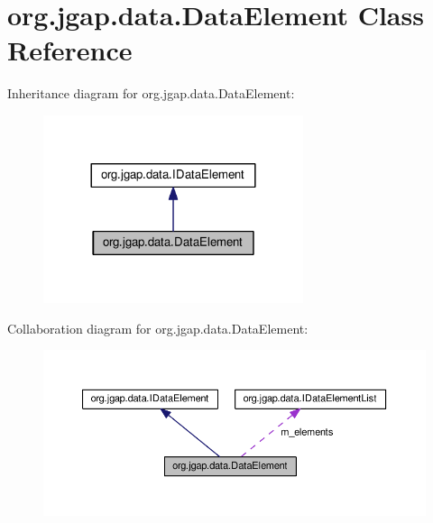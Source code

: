 \hypertarget{classorg_1_1jgap_1_1data_1_1_data_element}{\section{org.\-jgap.\-data.\-Data\-Element Class Reference}
\label{classorg_1_1jgap_1_1data_1_1_data_element}
}


Inheritance diagram for org.\-jgap.\-data.\-Data\-Element\-:
\nopagebreak
\begin{figure}[H]
\begin{center}
\leavevmode
\includegraphics[width=216pt]{classorg_1_1jgap_1_1data_1_1_data_element__inherit__graph}
\end{center}
\end{figure}


Collaboration diagram for org.\-jgap.\-data.\-Data\-Element\-:
\nopagebreak
\begin{figure}[H]
\begin{center}
\leavevmode
\includegraphics[width=350pt]{classorg_1_1jgap_1_1data_1_1_data_element__coll__graph}
\end{center}
\end{figure}

